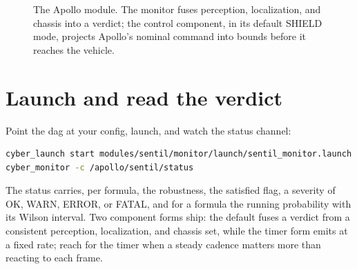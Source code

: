 \begin{figure}[h]
\centering
\begin{widefig}\end{widefig}
\caption{The Apollo module. The monitor fuses perception, localization, and chassis into a verdict; the control component, in its default SHIELD mode, projects Apollo's nominal command into bounds before it reaches the vehicle.}
\end{figure}

\section{Launch and read the verdict}

Point the dag at your config, launch, and watch the status channel:

\begin{lstlisting}[language=bash]
cyber_launch start modules/sentil/monitor/launch/sentil_monitor.launch
cyber_monitor -c /apollo/sentil/status
\end{lstlisting}

The status carries, per formula, the robustness, the satisfied flag, a severity of OK, WARN, ERROR, or FATAL, and for a  formula the running probability with its Wilson interval. Two component forms ship: the default fuses a verdict from a consistent perception, localization, and chassis set, while the timer form emits at a fixed rate; reach for the timer when a steady cadence matters more than reacting to each frame.

